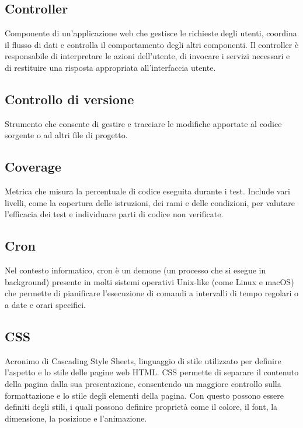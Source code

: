 \hypertarget{sec:controller}{}
\subsection*{Controller}
Componente di un'applicazione web che gestisce le richieste degli utenti, coordina il flusso di dati e controlla il comportamento degli altri componenti.
Il controller è responsabile di interpretare le azioni dell'utente, di invocare i servizi necessari e di restituire una risposta appropriata all'interfaccia utente.

\hypertarget{sec:controllo_versione}{}
\subsection*{Controllo di versione}
Strumento che consente di gestire e tracciare le modifiche apportate al codice sorgente o ad altri file di progetto.

\hypertarget{sec:coverage}{}
\subsection*{Coverage}
Metrica che misura la percentuale di codice eseguita durante i test. Include vari livelli, come la copertura delle istruzioni, dei rami e delle condizioni, per valutare l’efficacia dei test e individuare parti di codice non verificate.

\hypertarget{sec:cron}{}
\subsection*{Cron}
Nel contesto informatico, cron è un demone (un processo che si esegue in background) presente in molti sistemi operativi Unix-like 
(come Linux e macOS) che permette di pianificare l'esecuzione di comandi a intervalli di tempo regolari o a date e orari specifici.

\hypertarget{sec:css}{}
\subsection*{CSS}
Acronimo di Cascading Style Sheets, linguaggio di stile utilizzato per definire l’aspetto e lo stile delle pagine web HTML. CSS 
permette di separare il contenuto della pagina dalla sua presentazione, consentendo un maggiore controllo sulla formattazione e lo 
stile degli elementi della pagina. Con questo possono essere definiti degli stili, i quali possono definire proprietà come il colore, 
il font, la dimensione, la posizione e l’animazione.

\newpage